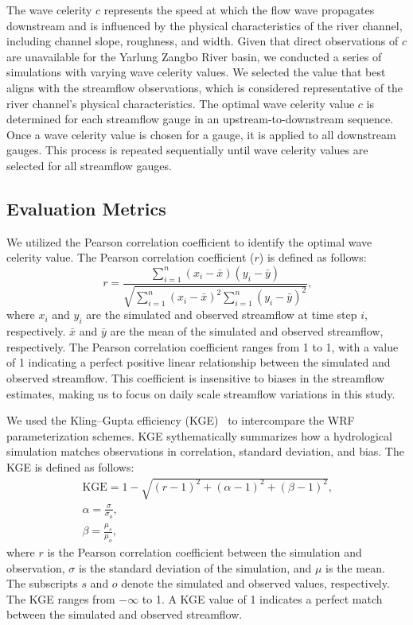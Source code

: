 \documentclass[draft]{agujournal2019}
\begin{document}
The wave celerity $c$ represents the speed at which the flow wave propagates downstream and is influenced by the physical characteristics of the river channel, including channel slope, roughness, and width. Given that direct observations of $c$ are unavailable for the Yarlung Zangbo River basin, we conducted a series of simulations with varying wave celerity values. We selected the value that best aligns with the streamflow observations, which is considered representative of the river channel's physical characteristics. The optimal wave celerity value $c$ is determined for each streamflow gauge in an upstream-to-downstream sequence. Once a wave celerity value is chosen for a gauge, it is applied to all downstream gauges. This process is repeated sequentially until wave celerity values are selected for all streamflow gauges.

\subsection{Evaluation Metrics}
\label{sec:metrics}

We utilized the Pearson correlation coefficient to identify the optimal wave celerity value. The Pearson correlation coefficient ($r$) is defined as follows:
\begin{equation}
  r = \frac{\sum_{i=1}^{n} (x_i - \bar{x})(y_i - \bar{y})}{\sqrt{\sum_{i=1}^{n} (x_i - \bar{x})^2 \sum_{i=1}^{n} (y_i - \bar{y})^2}} \textrm{,}
\end{equation}
where $x_i$ and $y_i$ are the simulated and observed streamflow at time step $i$, respectively. $\bar{x}$ and $\bar{y}$ are the mean of the simulated and observed streamflow, respectively. The Pearson correlation coefficient ranges from \textminus{}1 to 1, with a value of 1 indicating a perfect positive linear relationship between the simulated and observed streamflow. This coefficient is insensitive to biases in the streamflow estimates, making us to focus on daily scale streamflow variations in this study.

We used the Kling--Gupta efficiency (KGE)~\cite{gupta2009JH} to intercompare the WRF parameterization schemes. KGE sythematically summarizes how a hydrological simulation matches observations in correlation, standard deviation, and bias. The KGE is defined as follows:
\begin{eqnarray}
  \textrm{KGE} = 1 - \sqrt{\left(r - 1\right)^2 + \left(\alpha  - 1\right)^2 + \left(\beta - 1\right)^2} \textrm{,} \\
  \alpha  = \frac{\sigma}{\sigma_o} \textrm{,}                                                                 \\
  \beta = \frac{\mu_s}{\mu_o} \textrm{,}
\end{eqnarray}
where $r$ is the Pearson correlation coefficient between the simulation and observation, $\sigma$ is the standard deviation of the simulation, and $\mu$ is the mean. The subscripts $s$ and $o$ denote the simulated and observed values, respectively. The KGE ranges from $-\infty$ to 1. A KGE value of 1 indicates a perfect match between the simulated and observed streamflow.
\end{document}
